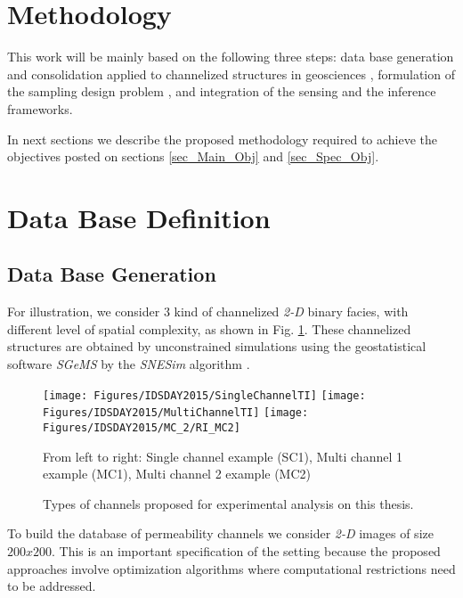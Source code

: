 \section{Methodology}
\label{sec_Meth_Base}

This work will be mainly based on the following three steps: data base generation and consolidation applied to channelized structures in geosciences \cite{Oliver_2008_a, Remy_2009_a, Ortiz_2004_a, huang_2013_a}, formulation of the sampling design problem \cite{krause11robust, BKMPW05, krause06near22, GuyagulerBaris2002_a}, and integration of the sensing and the inference frameworks. 

In next sections we describe the proposed methodology required to achieve the objectives posted on sections \ref{sec_Main_Obj} and \ref{sec_Spec_Obj}.



\section{Data Base Definition}

\subsection{Data Base Generation}
\label{sec_Meth_DB}

For illustration, we consider $3$ kind of channelized \emph{2-D} binary facies, with different level of spatial complexity, as shown in Fig. \ref{fig:Proposed_ChannelizedFields}. These channelized structures are obtained by unconstrained simulations using the geostatistical software \emph{SGeMS} by the \emph{SNESim} algorithm \cite{Remy_2009_a,huang_2013_a}.

\begin{figure}[ht!]
  \centering
    \texttt{[image: Figures/IDSDAY2015/SingleChannelTI]}
    \texttt{[image: Figures/IDSDAY2015/MultiChannelTI]}
    \texttt{[image: Figures/IDSDAY2015/MC\_2/RI\_MC2]}
	\caption{Types of channels proposed for experimental analysis on this thesis.}
	\small{From left to right: Single channel example (SC1), Multi channel 1 example (MC1), Multi channel 2 example (MC2)}
	\label{fig:Proposed_ChannelizedFields}	
 \end{figure}

\label{sec_Meth_RDB}

To build the database of permeability channels we consider \emph{2-D} images of size $200x200$. This is an important specification of the setting because the proposed approaches involve optimization algorithms where computational restrictions need to be addressed.







